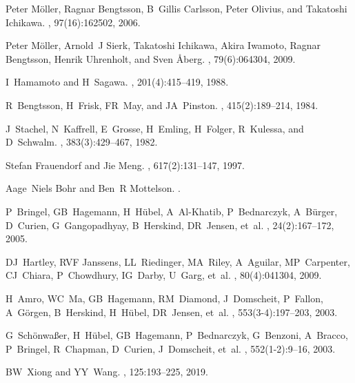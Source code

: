 \documentclass[myclassdoc,debug]{rjparticle}
\begin{document}
\begin{thebibliography}{99}

Peter M{\"o}ller, Ragnar Bengtsson, B~Gillis Carlsson, Peter Olivius, and
  Takatoshi Ichikawa.
, 97(16):162502, 2006.

Peter M{\"o}ller, Arnold~J Sierk, Takatoshi Ichikawa, Akira Iwamoto, Ragnar
  Bengtsson, Henrik Uhrenholt, and Sven {\AA}berg.
, 79(6):064304, 2009.

I~Hamamoto and H~Sagawa.
, 201(4):415--419, 1988.

R~Bengtsson, H~Frisk, FR~May, and JA~Pinston.
, 415(2):189--214, 1984.

J~Stachel, N~Kaffrell, E~Grosse, H~Emling, H~Folger, R~Kulessa, and D~Schwalm.
, 383(3):429--467, 1982.

Stefan Frauendorf and Jie Meng.
, 617(2):131--147, 1997.

Aage~Niels Bohr and Ben~R Mottelson.
.

P~Bringel, GB~Hagemann, H~H{\"u}bel, A~Al-Khatib, P~Bednarczyk, A~B{\"u}rger,
  D~Curien, G~Gangopadhyay, B~Herskind, DR~Jensen, et~al.
,
  24(2):167--172, 2005.

DJ~Hartley, RVF Janssens, LL~Riedinger, MA~Riley, A~Aguilar, MP~Carpenter,
  CJ~Chiara, P~Chowdhury, IG~Darby, U~Garg, et~al.
, 80(4):041304, 2009.

H~Amro, WC~Ma, GB~Hagemann, RM~Diamond, J~Domscheit, P~Fallon, A~G{\"o}rgen,
  B~Herskind, H~H{\"u}bel, DR~Jensen, et~al.
, 553(3-4):197--203, 2003.

G~Sch{\"o}nwa{\ss}er, H~H{\"u}bel, GB~Hagemann, P~Bednarczyk, G~Benzoni,
  A~Bracco, P~Bringel, R~Chapman, D~Curien, J~Domscheit, et~al.
, 552(1-2):9--16, 2003.


BW~Xiong and YY~Wang.
, 125:193--225, 2019.


\end{thebibliography}
\end{document}
